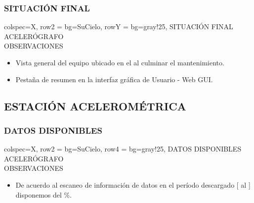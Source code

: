 \subsubsection{SITUACIÓN FINAL}
\begin{tblr}{
    colspec={X},
    row{2} = {bg=SuCielo},
    row{Y} = {bg=gray!25},
}
    SITUACIÓN FINAL \\
    ACELERÓGRAFO \MakeUppercase{} \\
    OBSERVACIONES \\
    \begin{itemize}
        \item Vista general del equipo ubicado en el  al culminar el mantenimiento.
        \item Pestaña de resumen en la interfaz gráfica de Usuario - Web GUI.
    \end{itemize}
\end{tblr}
\subsection{ESTACIÓN ACELEROMÉTRICA \MakeUppercase{}}
\subsubsection{DATOS DISPONIBLES}
\begin{tblr}[long]{
        colspec={X},
        row{2} = {bg=SuCielo},
        row{4} = {bg=gray!25},
    }
    DATOS DISPONIBLES \\
    ACELERÓGRAFO \MakeUppercase{} \\
    OBSERVACIONES \\
    \begin{itemize}
        \item De acuerdo al escaneo de información de datos en el período descargado [ al ] disponemos del  \unit{\percent}.
    \end{itemize}
\end{tblr}
